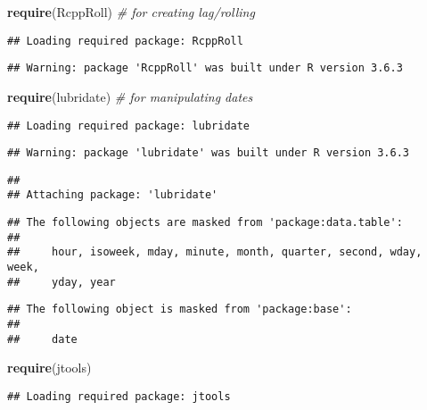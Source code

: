 \documentclass[
]{article}
\newenvironment{Shaded}{\begin{snugshade}}{\end{snugshade}}
\newcommand{\CommentTok}[1]{\textcolor[rgb]{0.56,0.35,0.01}{\textit{#1}}}
\newcommand{\KeywordTok}[1]{\textcolor[rgb]{0.13,0.29,0.53}{\textbf{#1}}}
\newcommand{\NormalTok}[1]{#1}
\begin{document}
\begin{Shaded}
\begin{Highlighting}[]
\KeywordTok{require}\NormalTok{(RcppRoll) }\CommentTok{# for creating lag/rolling}
\end{Highlighting}
\end{Shaded}

\begin{verbatim}
## Loading required package: RcppRoll
\end{verbatim}

\begin{verbatim}
## Warning: package 'RcppRoll' was built under R version 3.6.3
\end{verbatim}

\begin{Shaded}
\begin{Highlighting}[]
\KeywordTok{require}\NormalTok{(lubridate) }\CommentTok{# for manipulating dates}
\end{Highlighting}
\end{Shaded}

\begin{verbatim}
## Loading required package: lubridate
\end{verbatim}

\begin{verbatim}
## Warning: package 'lubridate' was built under R version 3.6.3
\end{verbatim}

\begin{verbatim}
## 
## Attaching package: 'lubridate'
\end{verbatim}

\begin{verbatim}
## The following objects are masked from 'package:data.table':
## 
##     hour, isoweek, mday, minute, month, quarter, second, wday, week,
##     yday, year
\end{verbatim}

\begin{verbatim}
## The following object is masked from 'package:base':
## 
##     date
\end{verbatim}

\begin{Shaded}
\begin{Highlighting}[]
\KeywordTok{require}\NormalTok{(jtools)}
\end{Highlighting}
\end{Shaded}

\begin{verbatim}
## Loading required package: jtools
\end{verbatim}
\end{document}
